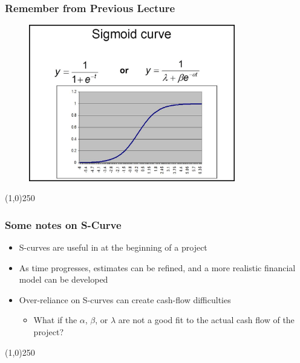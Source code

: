 \begin{frame}
\frametitle{Remember from Previous Lecture}
\begin{figure}
	\centering
		\includegraphics[width = 9cm]{images/sigcurverecap.jpg}
	\label{fig:sigcurverecap}
\end{figure}
\end{frame}
\begin{center}\line(1,0){250}\end{center}






\begin{frame}
\frametitle{Some notes on S-Curve}
\begin{itemize}
	\item S-curves are useful in at the beginning of a project
	\item As time progresses, estimates can be refined, and a more realistic financial model can be developed
	\item Over-reliance on S-curves can create cash-flow difficulties
	\begin{itemize}
		\item What if the $\alpha$, $\beta$, or $\lambda$ are not a good fit to the actual cash flow of the project?
	\end{itemize}
\end{itemize}	
\end{frame}
\begin{center}\line(1,0){250}\end{center}






